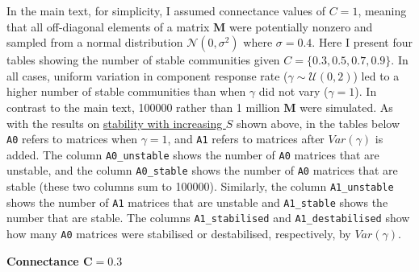 \documentclass[]{article}
\begin{document}
In the main text, for simplicity, I assumed connectance values of
\(C = 1\), meaning that all off-diagonal elements of a matrix
\(\mathbf{M}\) were potentially nonzero and sampled from a normal
distribution \(\mathcal{N}(0, \sigma^{2})\) where \(\sigma = 0.4\). Here
I present four tables showing the number of stable communities given
\(C = \{0.3, 0. 5, 0.7, 0.9 \}\). In all cases, uniform variation in
component response rate (\(\gamma \sim \mathcal{U}(0, 2)\)) led to a
higher number of stable communities than when \(\gamma\) did not vary
(\(\gamma = 1\)). In contrast to the main text, 100000 rather than 1
million \(\mathbf{M}\) were simulated. As with the results on
\protect\hyperlink{IncrS}{stability with increasing \(S\)} shown above,
in the tables below \texttt{A0} refers to matrices when \(\gamma = 1\),
and \texttt{A1} refers to matrices after \(Var(\gamma)\) is added. The
column \texttt{A0\_unstable} shows the number of \texttt{A0} matrices
that are unstable, and the column \texttt{A0\_stable} shows the number
of \texttt{A0} matrices that are stable (these two columns sum to
100000). Similarly, the column \texttt{A1\_unstable} shows the number of
\texttt{A1} matrices that are unstable and \texttt{A1\_stable} shows the
number that are stable. The columns \texttt{A1\_stabilised} and
\texttt{A1\_destabilised} show how many \texttt{A0} matrices were
stabilised or destabilised, respectively, by \(Var(\gamma)\).

\textbf{Connectance \(\mathbf{C = 0.3}\)}
\end{document}
